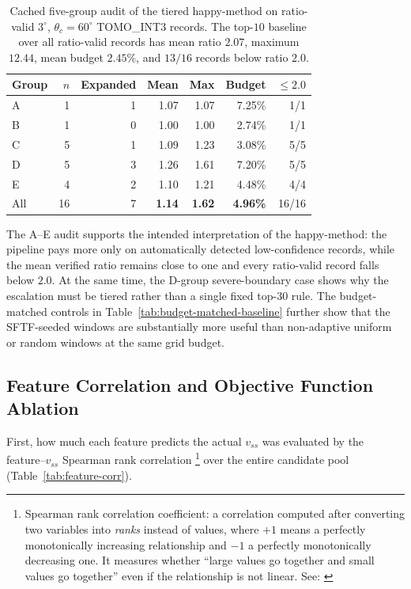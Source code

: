 \documentclass[11pt,a4paper]{article}
\begin{document}
\begin{table}[H]
\centering
\caption{Cached five-group audit of the tiered happy-method on ratio-valid $3^\circ$, $\theta_c=60^\circ$ TOMO\_INT3 records.
The top-$10$ baseline over all ratio-valid records has mean ratio $2.07$, maximum $12.44$, mean budget $2.45\%$, and $13/16$ records below ratio $2.0$.}
\label{tab:happy-method-g5}
\small
\begin{tabular}{lrrrrrr}
\toprule
Group & $n$ & Expanded & Mean & Max & Budget & $\le 2.0$\\
\midrule
A & 1 & 1 & 1.07 & 1.07 & 7.25\% & 1/1\\
B & 1 & 0 & 1.00 & 1.00 & 2.74\% & 1/1\\
C & 5 & 1 & 1.09 & 1.23 & 3.08\% & 5/5\\
D & 5 & 3 & 1.26 & 1.61 & 7.20\% & 5/5\\
E & 4 & 2 & 1.10 & 1.21 & 4.48\% & 4/4\\
\midrule
All & 16 & 7 & \textbf{1.14} & \textbf{1.62} & \textbf{4.96\%} & 16/16\\
\bottomrule
\end{tabular}
\end{table}

The A--E audit supports the intended interpretation of the happy-method:
the pipeline pays more only on automatically detected low-confidence records,
while the mean verified ratio remains close to one and every ratio-valid record falls below $2.0$.
At the same time, the D-group severe-boundary case shows why the escalation must be tiered rather than a single fixed top-$30$ rule.
The budget-matched controls in Table~\ref{tab:budget-matched-baseline} further show that the SFTF-seeded windows
are substantially more useful than non-adaptive uniform or random windows at the same grid budget.

\subsection{Feature Correlation and Objective Function Ablation}
\label{sec:ablation}

First, how much each feature predicts the actual $v_{ss}$ was evaluated by the
feature--$v_{ss}$ Spearman rank correlation%
\footnote{Spearman rank correlation coefficient: a correlation computed after converting two variables into \emph{ranks} instead of values,
where $+1$ means a perfectly monotonically increasing relationship and $-1$ a perfectly monotonically decreasing one. It measures whether
``large values go together and small values go together'' even if the relationship is not linear. See: \cite{spearman1904}}
over the entire candidate pool (Table~\ref{tab:feature-corr}).
\end{document}
